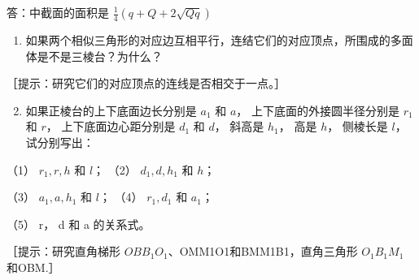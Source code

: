 答：中截面的面积是 \(\frac{1}{4} (q + Q + 2\sqrt{Qq})\)

\begin{enumerate}
\item
  如果两个相似三角形的对应边互相平行，连结它们的对应顶点，所围成的多面体是不是三棱台？为什么？
\end{enumerate}

［提示：研究它们的对应顶点的连线是否相交于一点。］

\begin{enumerate}
\setcounter{enumi}{1}
\item
  如果正棱台的上下底面边长分别是 \(a_1\) 和 \(a\)，
  上下底面的外接圆半径分别是 \(r_1\) 和 \(r\)， 上下底面边心距分别是
  \(d_1\) 和 \(d\)， 斜高是 \(h_1\)， 高是 \(h\)， 侧棱长是 \(l\)，
  试分别写出：
\end{enumerate}

（1） \(r_1, r, h\) 和 \(l\)； （2） \(d_1, d, h_1\) 和 \(h\)；

（3） \(a_{1}, a, h_{1}\) 和 \(l\)； （4） \(r_{1}, d_{1}\) 和
\(a_{1}\)；

（5） r， d 和 a 的关系式。

［提示：研究直角梯形 \(OBB_{1}O_{1}\)、OMM1O1和BMM1B1，直角三角形
\(O_{1}B_{1}M_{1}\) 和OBM.］


